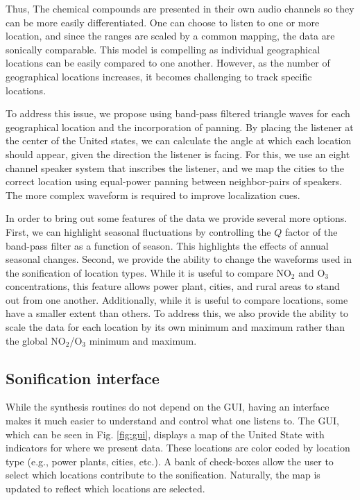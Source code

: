 \documentclass[a4paper,10pt,oneside]{article}
\newcommand{\ce}[1]{$\mathrm{#1}$}
\begin{document}
\begin{sloppy}
Thus,   The chemical compounds are presented in their own audio channels so they can be more easily differentiated.  One can choose to listen to one or more location, and since the ranges are scaled by a common mapping, the data are sonically comparable. This model is compelling as individual geographical locations can be easily compared to one another. However, as the number of geographical locations increases, it becomes challenging to track specific locations. 

To address this issue, we propose using band-pass filtered triangle waves for each geographical location and the incorporation of panning. By placing the listener at the center of the United states, we can calculate the angle at which each location should appear, given the direction the listener is facing.  For this, we use an eight channel speaker system that inscribes the listener, and we map the cities to the correct location using equal-power panning between neighbor-pairs of speakers.  The more complex waveform is required to improve localization cues.  

In order to bring out some features of the data we provide several more options. First, we can highlight seasonal fluctuations by controlling the $Q$ factor of the band-pass filter as a function of season. This highlights the effects of annual seasonal changes. Second, we provide the ability to change the waveforms used in the sonification of location types. While it is useful to compare \ce{NO_2} and \ce{O_3} concentrations, this feature allows power plant, cities, and rural areas to stand out from one another. Additionally, while it is useful to compare locations, some have a smaller extent than others. To address this, we also provide the ability to scale the data for each location by its own minimum and maximum rather than the global \ce{NO_2}/\ce{O_3} minimum and maximum.  


\subsection{Sonification interface}

While the synthesis routines do not depend on the GUI, having an interface makes it much easier to understand and control what one listens to. The GUI, which can be seen in Fig. \ref{fig:gui}, displays a map of the United State with indicators for where we present data.  These locations are color coded by location type (e.g., power plants, cities, etc.). A bank of check-boxes allow the user to select which locations contribute to the sonification. Naturally, the map is updated to reflect which locations are selected.  



\end{sloppy}
\end{document}

